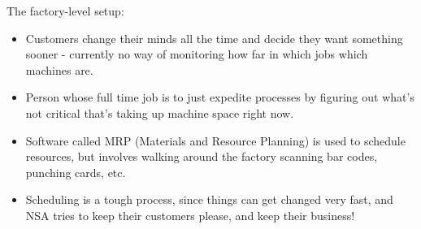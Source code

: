 \documentclass[12pt,letterpaper,titlepage]{article}
\newlength{\wideitemsep}
\let\olditem\item
\renewcommand{\item}{\setlength{\itemsep}{\wideitemsep}\olditem}
\begin{document}
The factory-level setup:
\begin{itemize}
\item Customers change their minds all the time and decide they want something sooner - currently no way of monitoring how far in which jobs which machines are.
\item Person whose full time job is to just expedite processes by figuring out what’s not critical that’s taking up machine space right now.
\item Software called MRP (Materials and Resource Planning) is used to schedule resources, but involves walking around the factory scanning bar codes, punching cards, etc.
\item Scheduling is a tough process, since things can get changed very fast, and NSA tries to keep their customers please, and keep their business!
\end{itemize}


\newpage
\end{document}
